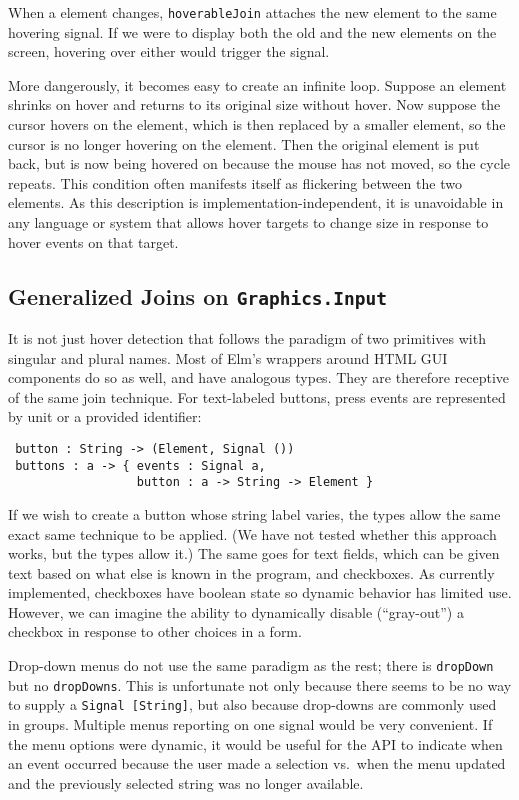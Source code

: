 \documentclass{article}
\begin{document}
When a element changes, \texttt{hoverableJoin} attaches the new element to the
same hovering signal. If we were to display both the old and the new elements on
the screen, hovering over either would trigger the signal.

More dangerously, it becomes easy to create an infinite loop. Suppose an element
shrinks on hover and returns to its original size without hover. Now suppose the
cursor hovers on the element, which is then replaced by a smaller element, so
the cursor is no longer hovering on the element. Then the original element is
put back, but is now being hovered on because the mouse has not moved, so the
cycle repeats. This condition often manifests itself as flickering between the
two elements. As this description is implementation-independent, it is
unavoidable in any language or system that allows hover targets to change size
in response to hover events on that target.

\subsection{Generalized Joins on \texttt{Graphics.Input}}

It is not just hover detection that follows the paradigm of two primitives
with singular and plural names. Most of Elm's wrappers around HTML GUI
components do so as well, and have analogous types. They are therefore receptive
of the same join technique. For text-labeled buttons, press events are
represented by unit or a provided identifier:

\begin{verbatim}
 button : String -> (Element, Signal ())
 buttons : a -> { events : Signal a,
                  button : a -> String -> Element }
\end{verbatim}

If we wish to create a button whose string label varies, the types allow
the same exact same technique to be applied. (We have not tested whether
this approach works, but the types allow it.) The same goes for text
fields, which can be given text based on what else is known in the
program, and checkboxes. As currently implemented, checkboxes have
boolean state so dynamic behavior has limited use. However, we can
imagine the ability to dynamically disable (``gray-out'') a checkbox in response
to other choices in a form.

Drop-down menus do not use the same paradigm as the rest; there is
\texttt{dropDown} but no \texttt{dropDowns}. This is unfortunate not
only because there seems to be no way to supply a
\texttt{Signal {[}String{]}}, but also because drop-downs are commonly used
in groups. Multiple menus reporting on one signal would be very
convenient. If the menu options were dynamic, it would be useful for the API to
indicate when an event occurred because the user made a selection vs.~when the
menu updated and the previously selected string was no longer available.
\end{document}
